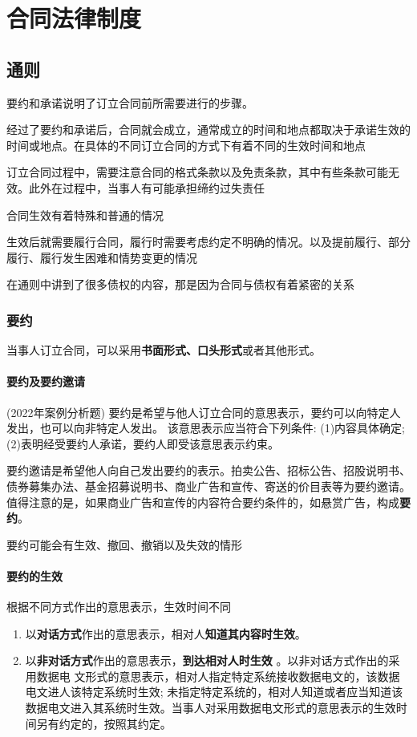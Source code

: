 \documentclass[UTF8,12pt]{ctexart}
\numberwithin{equation}{section} %
\numberwithin{figure}{section}
\numberwithin{table}{section}
\begin{document}
	\newpage
	\section{合同法律制度}
	
	\subsection{通则}
	要约和承诺说明了订立合同前所需要进行的步骤。
	
	经过了要约和承诺后，合同就会成立，通常成立的时间和地点都取决于承诺生效的时间或地点。在具体的不同订立合同的方式下有着不同的生效时间和地点
	
	订立合同过程中，需要注意合同的格式条款以及免责条款，其中有些条款可能无效。此外在过程中，当事人有可能承担缔约过失责任
	
	合同生效有着特殊和普通的情况
	
	生效后就需要履行合同，履行时需要考虑约定不明确的情况。以及提前履行、部分履行、履行发生困难和情势变更的情况
	
	
	在通则中讲到了很多债权的内容，那是因为合同与债权有着紧密的关系
	
	\subsubsection{要约}
	当事人订立合同，可以采用\textbf{书面形式、口头形式}或者其他形式。
	
	\paragraph{要约及要约邀请}(2022年案例分析题) 要约是希望与他人订立合同的意思表示，要约可以向特定人发出，也可以向非特定人发出。 该意思表示应当符合下列条件:
	(1)内容具体确定;
	(2)表明经受要约人承诺，要约人即受该意思表示约束。
	
	要约邀请是希望他人向自己发出要约的表示。拍卖公告、招标公告、招股说明书、债券募集办法、基金招募说明书、商业广告和宣传、寄送的价目表等为要约邀请。值得注意的是，如果商业广告和宣传的内容符合要约条件的，如悬赏广告，构成\textbf{要约}。
	
	要约可能会有生效、撤回、撤销以及失效的情形
	
	\paragraph{要约的生效}
	根据不同方式作出的意思表示，生效时间不同
	\begin{enumerate}
		\item 以\textbf{对话方式}作出的意思表示，相对人\textbf{知道其内容时生效}。
		
		\item 以\textbf{非对话方式}作出的意思表示，\textbf{到达相对人时生效} 。以非对话方式作出的采用数据电 文形式的意思表示，相对人指定特定系统接收数据电文的，该数据电文进人该特定系统时生效; 未指定特定系统的，相对人知道或者应当知道该数据电文进入其系统时生效。当事人对采用数据电文形式的意思表示的生效时间另有约定的，按照其约定。
	\end{enumerate}
	
\end{document}

